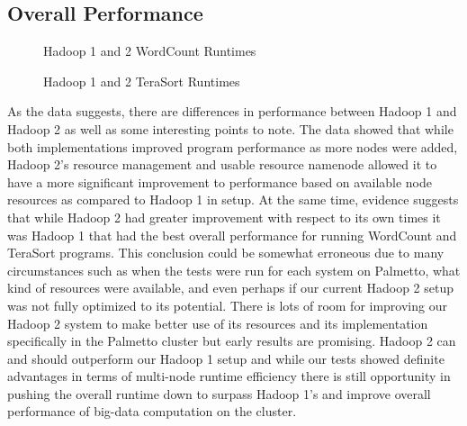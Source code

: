\documentclass[conference]{IEEEtran}
\begin{document}
				\subsection{Overall Performance}
						\begin{figure}[h]
                   					\begin{center}
                       						
                        						\caption{Hadoop 1 and 2 WordCount Runtimes}
                    					\end{center}
						\end{figure}
						\begin{figure}[h]
                   					\begin{center}
                       					
                        					\caption{Hadoop 1 and 2 TeraSort Runtimes}
                    				\end{center}
						\end{figure}

						As the data suggests, there are differences in performance between Hadoop 1 and Hadoop 2 as well as some interesting points to note. The data showed that while both implementations improved program performance as more nodes were added, Hadoop 2’s resource management and usable resource namenode allowed it to have a more significant improvement to performance based on available node resources as compared to Hadoop 1 in setup. At the same time, evidence suggests that while Hadoop 2 had greater improvement with respect to its own times it was Hadoop 1 that had the best overall performance for running WordCount and TeraSort programs. This conclusion could be somewhat erroneous due to many circumstances such as when the tests were run for each system on Palmetto, what kind of resources were available, and even perhaps if our current Hadoop 2 setup was not fully optimized to its potential. There is lots of room for improving our Hadoop 2 system to make better use of its resources and its implementation specifically in the Palmetto cluster but early results are promising. Hadoop 2 can and should outperform our Hadoop 1 setup and while our tests showed definite advantages in terms of multi-node runtime efficiency there is still opportunity in pushing the overall runtime down to surpass Hadoop 1’s and improve overall performance of big-data computation on the cluster.
\end{document}
